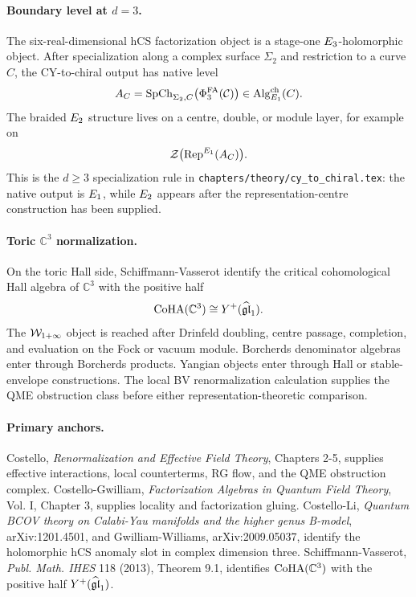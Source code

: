 \paragraph{Boundary level at \(d=3\).}
The six-real-dimensional hCS factorization object is a stage-one
\(E_3\)-holomorphic object.  After specialization along a complex
surface \(\Sigma_2\) and restriction to a curve \(C\), the CY-to-chiral
output has native level
\[
  A_C
  =
  \operatorname{SpCh}_{\Sigma_2,C}
  \bigl(\Phi^{\mathrm{FA}}_3(\mathcal C)\bigr)
  \in
  \operatorname{Alg}^{\mathrm{ch}}_{E_1}(C).
\]
The braided \(E_2\) structure lives on a centre, double, or module
layer, for example on
\[
  \mathcal{Z}\bigl(\mathrm{Rep}^{E_1}(A_C)\bigr).
\]
This is the \(d\geq3\) specialization rule in
\texttt{chapters/theory/cy\_to\_chiral.tex}: the native output is
\(E_1\), while \(E_2\) appears after the representation-centre
construction has been supplied.

\paragraph{Toric \(\mathbb C^3\) normalization.}
On the toric Hall side, Schiffmann-Vasserot identify the critical
cohomological Hall algebra of \(\mathbb C^3\) with the positive half
\[
  \mathrm{CoHA}(\mathbb C^3)\cong
  Y^{+}(\widehat{\mathfrak{gl}}_1).
\]
The \(\mathcal{W}_{1+\infty}\) object is reached after Drinfeld doubling, centre
passage, completion, and evaluation on the Fock or vacuum module.
Borcherds denominator algebras enter through Borcherds products.
Yangian objects enter through Hall or stable-envelope constructions.
The local BV renormalization calculation supplies the QME obstruction
class before either representation-theoretic comparison.

\paragraph{Primary anchors.}
Costello, \emph{Renormalization and Effective Field Theory}, Chapters
2-5, supplies effective interactions, local counterterms, RG flow, and
the QME obstruction complex.  Costello-Gwilliam, \emph{Factorization
Algebras in Quantum Field Theory}, Vol. I, Chapter 3, supplies locality
and factorization gluing.  Costello-Li, \emph{Quantum BCOV theory on
Calabi-Yau manifolds and the higher genus B-model}, arXiv:1201.4501,
and Gwilliam-Williams, arXiv:2009.05037, identify the holomorphic hCS
anomaly slot in complex dimension three.  Schiffmann-Vasserot,
\emph{Publ. Math. IHES} 118 (2013), Theorem 9.1, identifies
\(\mathrm{CoHA}(\mathbb C^3)\) with the positive half
\(Y^{+}(\widehat{\mathfrak{gl}}_1)\).
